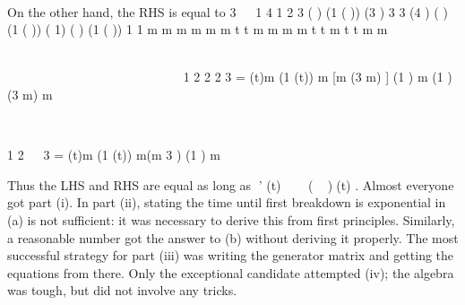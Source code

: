  	  	 	  	   	
 

On the other hand, the RHS is equal to
3  
1 4 1 2
3
( ) (1 ( )) (3 )
3 3
(4 ) ( ) (1 ( )) ( 1) ( ) (1 ( ))
1 1
m m
m m m m
t t m m
m
m t t m t t
m m

   
 
 	      

 
   
  	      	   
   
  
  1 2 2 2 3
= (t)m (1 (t)) m [m (3 m) ] (1 ) m (1 ) (3 m)
m
   

 	  	     	  	    	   	
 

1 2   3
= (t)m (1 (t)) m(m 3 ) (1 )
m
   
         
	 

Thus the LHS and RHS are equal as long as ’ (t)    ( )(t) .
Almost everyone got part (i). In part (ii), stating the time until first breakdown is
exponential in (a) is not sufficient: it was necessary to derive this from first principles.
Similarly, a reasonable number got the answer to (b) without deriving it properly.
The most successful strategy for part (iii) was writing the generator matrix and
getting the equations from there.
Only the exceptional candidate attempted (iv); the algebra was tough, but did not
involve any tricks.
